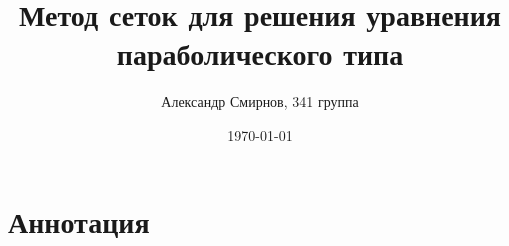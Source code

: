 \documentclass[a4paper,12pt]{article}
\author{Александр Смирнов, 341 группа}
\title{Метод сеток для решения уравнения параболического типа}
\date{\today}
\begin{document}
 

\maketitle

\section{Аннотация}
\end{document}
